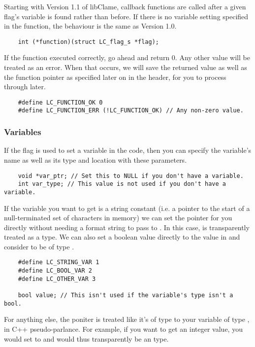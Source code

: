 Starting with Version 1.1 of libClame, callback functions are called after a given flag's variable is found rather than before. If there is no variable setting specified in the function, the behaviour is the same as Version 1.0.

\begin{verbatim}
	int (*function)(struct LC_flag_s *flag);
\end{verbatim}

If the function executed correctly, go ahead and return 0. Any other value will be treated as an error. When that occurs, we will save the returned value as well as the function pointer as specified later on in the header, for you to process through later.

\begin{verbatim}
	#define LC_FUNCTION_OK 0
	#define LC_FUNCTION_ERR (!LC_FUNCTION_OK) // Any non-zero value.
\end{verbatim}

\subsubsection{Variables}
\label{sec:var-discussion}

If the flag is used to set a variable in the code, then you can specify the variable's name as well as its type and location with these parameters.

\begin{verbatim}
	void *var_ptr; // Set this to NULL if you don't have a variable.
	int var_type; // This value is not used if you don't have a variable.
\end{verbatim}

If the variable you want to get is a string constant (i.e. a pointer to the start of a null-terminated set of characters in memory) we can set the pointer for you directly without needing a format string to pass to . In this case,  is transparently treated as a  type. We can also set a boolean value directly to the value in  and consider  to be of type .

\begin{verbatim}
	#define LC_STRING_VAR 1
	#define LC_BOOL_VAR 2
	#define LC_OTHER_VAR 3

	bool value; // This isn't used if the variable's type isn't a bool.
\end{verbatim}

For anything else, the poniter is treated like it's of type  to your variable of type , in C++ pseudo-parlance. For example, if you want to get an integer value, you would set  to  and  would thus transparently be an  type.

